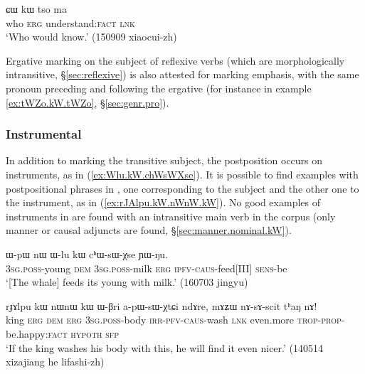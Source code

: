 \begin{exe}
\ex \label{ex:kW.tso}
\gll ɕɯ kɯ tso ma \\
who \textsc{erg} understand:\textsc{fact} \textsc{lnk} \\
\glt `Who would know.' (150909 xiaocui-zh) 
\end{exe}

Ergative marking on the subject of reflexive verbs (which are morphologically intransitive, §\ref{sec:reflexive}) is also attested for marking emphasis, with the same pronoun preceding and following the ergative (for instance  in example \ref{ex:tWZo.kW.tWZo}, §\ref{sec:genr.pro}).

\subsubsection{Instrumental} \label{sec:instr.kW}
 
In addition to marking the transitive subject, the postposition  occurs on instruments, as in (\ref{ex:Wlu.kW.chWsWXse}). It is possible to find examples with  postpositional phrases in , one corresponding to the subject and the other one to the instrument, as in (\ref{ex:rJAlpu.kW.nWnW.kW}). No good examples of instruments in  are found with an intransitive main verb in the corpus (only manner or causal adjuncts are found, §\ref{sec:manner.nominal.kW}).

\begin{exe}
\ex \label{ex:Wlu.kW.chWsWXse}
 \gll ɯ-pɯ nɯ ɯ-lu kɯ cʰɯ-sɯ-χse ɲɯ-ŋu. \\
 \textsc{3sg}.\textsc{poss}-young \textsc{dem} \textsc{3sg}.\textsc{poss}-milk \textsc{erg} \textsc{ipfv}-\textsc{caus}-feed[III] \textsc{sens}-be \\
\glt `[The whale] feeds its young with milk.' (160703 jingyu)
\end{exe}

\begin{exe}
\ex \label{ex:rJAlpu.kW.nWnW.kW}
 \gll  rɟɤlpu kɯ nɯnɯ kɯ ɯ-βri a-pɯ-sɯ-χtɕi ndɤre, mɤʑɯ nɤ-sɤ-scit tʰaŋ nɤ!\\
 king \textsc{erg} \textsc{dem} \textsc{erg} \textsc{3sg}.\textsc{poss}-body \textsc{irr}-\textsc{pfv}-\textsc{caus}-wash \textsc{lnk} even.more \textsc{trop}-\textsc{prop}-be.happy:\textsc{fact} \textsc{hypoth} \textsc{sfp} \\
 \glt `If the king washes his body with this, he will find it even nicer.' (140514 xizajiang he lifashi-zh)
\end{exe}

